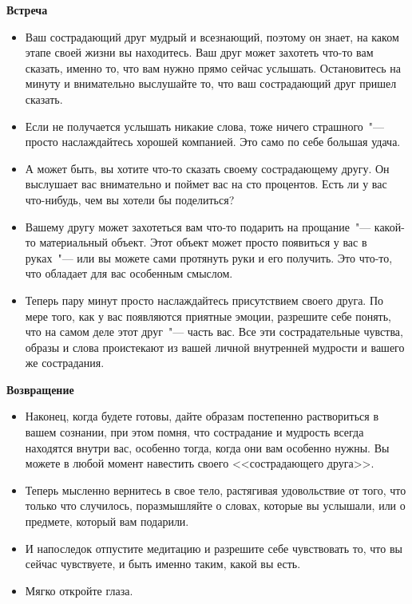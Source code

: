 \vspace{3ex}

{\large \textbf{Встреча}}
\begin{itemize}
	\item Ваш сострадающий друг мудрый и всезнающий, поэтому он знает, на каком этапе своей жизни вы находитесь. Ваш друг может захотеть что-то вам сказать, именно то, что вам нужно прямо сейчас услышать. Остановитесь на минуту и внимательно выслушайте то, что ваш сострадающий друг пришел сказать.
	
	\item Если не получается услышать никакие слова, тоже ничего страшного~"--- просто наслаждайтесь хорошей компанией. Это само по себе большая удача.
	
	\item А может быть, вы хотите что-то сказать своему сострадающему другу. Он выслушает вас внимательно и поймет вас на сто процентов. Есть ли у вас что-нибудь, чем вы хотели бы поделиться?
	
	\item Вашему другу может захотеться вам что-то подарить на прощание~"--- какой-то материальный объект. Этот объект может просто появиться у вас в руках~"--- или вы можете сами протянуть руки и его получить. Это что-то, что обладает для вас особенным смыслом.
	
	\item Теперь пару минут просто наслаждайтесь присутствием своего друга. По мере того, как у вас появляются приятные эмоции, разрешите себе понять, что на самом деле этот друг~"--- часть вас. Все эти сострадательные чувства, образы и слова проистекают из вашей личной внутренней мудрости и вашего же сострадания.
\end{itemize}

\vspace{3ex}

{\large \textbf{Возвращение}}
\begin{itemize}
	\item Наконец, когда будете готовы, дайте образам постепенно раствориться в вашем сознании, при этом помня, что сострадание и мудрость всегда находятся внутри вас, особенно тогда, когда они вам особенно нужны. Вы можете в любой момент навестить своего <<сострадающего друга>>.
	
	\item Теперь мысленно вернитесь в свое тело, растягивая удовольствие от того, что только что случилось, поразмышляйте о словах, которые вы услышали, или о предмете, который вам подарили.
	
	\item И напоследок отпустите медитацию и разрешите себе чувствовать то, что вы сейчас чувствуете, и быть именно таким, какой вы есть.
	
	\item Мягко откройте глаза.
\end{itemize}

